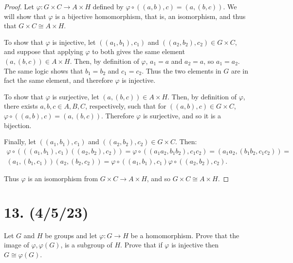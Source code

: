\documentclass{article}
\begin{document}
\begin{proof}
    Let $\varphi: G \times C \rightarrow A \times H$ defined by $\varphi \circ ((a, b), c) = (a, (b, c))$. We will show that $\varphi$ is a bijective homomorphism, that is, an isomorphism, and thus that $G \times C \cong A \times H$.

    To show that $\varphi$ is injective, let $((a_1, b_1), c_1)$ and $((a_2, b_2), c_2) \in G \times C$, and suppose that applying $\varphi$ to both gives the same element $(a, (b, c)) \in A \times H$. Then, by definition of $\varphi$, $a_1 = a$ and $a_2 = a$, so $a_1 = a_2$. The same logic shows that $b_1 = b_2$ and $c_1 = c_2$. Thus the two elements in $G$ are in fact the same element, and therefore $\varphi$ is injective.

    To show that $\varphi$ is surjective, let $(a, (b, c)) \in A \times H$. Then, by definition of $\varphi$, there exists $a, b, c \in A, B, C$, respectively, such that for $((a, b), c) \in G \times C$, $\varphi \circ ((a, b), c) = (a, (b, c))$. Therefore $\varphi$ is surjective, and so it is a bijection.

    Finally, let $((a_1, b_1), c_1)$ and $((a_2, b_2), c_2) \in G \times C$. Then:
    \begin{multline*}
        \varphi \circ (((a_1, b_1), c_1)((a_2, b_2), c_2)) = \varphi \circ ((a_1 a_2, b_1 b_2), c_1 c_2) = (a_1 a_2, (b_1 b_2, c_1 c_2)) = \\
        (a_1, (b_1, c_1))(a_2, (b_2, c_2)) = \varphi \circ ((a_1, b_1), c_1) \varphi \circ ((a_2, b_2), c_2).
    \end{multline*}

    Thus $\varphi$ is an isomorphism from $G \times C \rightarrow A \times H$, and so $G \times C \cong A \times H$.
\end{proof}

\section*{13. (4/5/23)}

Let $G$ and $H$ be groups and let $\varphi: G \rightarrow H$ be a homomorphism. Prove that the image of $\varphi, \varphi(G)$, is a subgroup of $H$. Prove that if $\varphi$ is injective then $G \cong \varphi(G)$.
\end{document}
